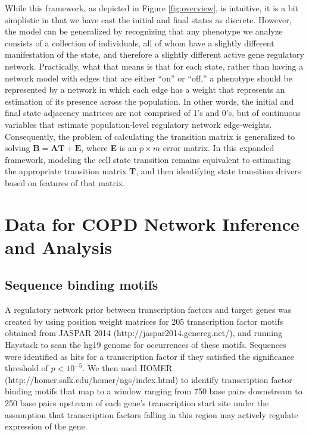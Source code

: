While this framework, as depicted in Figure \ref{fig:overview}, is intuitive, it is a bit simplistic in that we have cast the initial and final states as discrete. However, the model can be generalized by recognizing that any phenotype we analyze consists of a collection of individuals, all of whom have a slightly different manifestation of the state, and therefore a slightly different active gene regulatory network. Practically, what that means is that for each state, rather than having a network model with edges that are either ``on'' or ``off,'' a phenotype should be represented by a network in which each edge has a weight that represents an estimation of its presence across the population. In other words, the initial and final state adjacency matrices are not comprised of 1's and 0's, but of continuous variables that estimate population-level regulatory network edge-weights. Consequently, the problem of calculating the transition matrix is generalized to solving $\mathbf{B}=\mathbf{A}\mathbf{T}+\mathbf{E}$, where \textbf{E} is an $p\times m$ error matrix. In this expanded framework, modeling the cell state transition remains equivalent to estimating the appropriate transition matrix \textbf{T}, and then identifying state transition drivers based on features of that matrix.  

\section*{Data for COPD Network Inference and Analysis}

\subsection*{Sequence binding motifs}
A regulatory network prior between transcription factors and target genes was created by using position weight matrices for 205 transcription factor motifs obtained from JASPAR 2014 (http://jaspar2014.genereg.net/), \cite{mathelier2013jaspar} and running Haystack\cite{pinello2014analysis} to scan the hg19 genome for occurrences of these motifs. Sequences were identified as hits for a transcription factor if they satisfied the significance threshold of $p<10^{-5}$. We then used HOMER (http://homer.salk.edu/homer/ngs/index.html) \cite{heinz2010simple} to identify transcription factor binding motifs that map to a window ranging from 750 base pairs downstream to 250 base pairs upstream of each gene's transcription start site under the assumption that transcription factors falling in this region may actively regulate expression of the gene.

